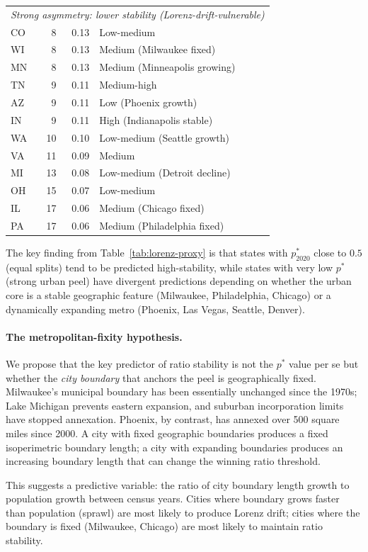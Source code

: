 \begin{table}[h]
\begin{tabular}{l r r l}
\multicolumn{4}{l}{\textit{Strong asymmetry: lower stability (Lorenz-drift-vulnerable)}} \\
CO  & 8 & 0.13 & Low-medium \\
WI  & 8 & 0.13 & Medium (Milwaukee fixed) \\
MN  & 8 & 0.13 & Medium (Minneapolis growing) \\
TN  & 9 & 0.11 & Medium-high \\
AZ  & 9 & 0.11 & Low (Phoenix growth) \\
IN  & 9 & 0.11 & High (Indianapolis stable) \\
WA  & 10 & 0.10 & Low-medium (Seattle growth) \\
VA  & 11 & 0.09 & Medium \\
MI  & 13 & 0.08 & Low-medium (Detroit decline) \\
OH  & 15 & 0.07 & Low-medium \\
IL  & 17 & 0.06 & Medium (Chicago fixed) \\
PA  & 17 & 0.06 & Medium (Philadelphia fixed) \\
\bottomrule
\end{tabular}
\end{table}

The key finding from Table~\ref{tab:lorenz-proxy} is that states with
$p^*_{2020}$ close to $0.5$ (equal splits) tend to be predicted high-stability,
while states with very low $p^*$ (strong urban peel) have divergent predictions
depending on whether the urban core is a stable geographic feature
(Milwaukee, Philadelphia, Chicago) or a dynamically expanding metro
(Phoenix, Las Vegas, Seattle, Denver).

\paragraph{The metropolitan-fixity hypothesis.}
We propose that the key predictor of ratio stability is not the $p^*$ value
per se but whether the \emph{city boundary} that anchors the peel is
geographically fixed.
Milwaukee's municipal boundary has been essentially unchanged since the 1970s;
Lake Michigan prevents eastern expansion, and suburban incorporation limits
have stopped annexation.
Phoenix, by contrast, has annexed over 500 square miles since 2000.
A city with fixed geographic boundaries produces a fixed isoperimetric
boundary length; a city with expanding boundaries produces an increasing
boundary length that can change the winning ratio threshold.

This suggests a predictive variable: the ratio of city boundary length growth
to population growth between census years.
Cities where boundary grows faster than population (sprawl) are most likely
to produce Lorenz drift; cities where the boundary is fixed (Milwaukee, Chicago)
are most likely to maintain ratio stability.
